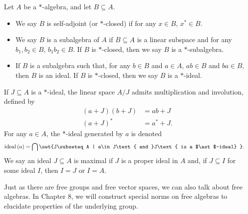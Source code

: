 \begin{definition}
  Let $A$ be a $\ast$-algebra, and let $B\subseteq A$.
  \begin{itemize}
    \item We say $B$ is self-adjoint (or $\ast$-closed) if for any $x\in B$, $x^{\ast}\in B$.
    \item We say $B$ is a subalgebra of $A$ if $B\subseteq A$ is a linear subspace and for any $b_1,b_2\in B$, $b_1b_2\in B$. If $B$ is $\ast$-closed, then we say $B$ is a $\ast$-subalgebra.
    \item If $B$ is a subalgebra such that, for any $b\in B$ and $a\in A$, $ab\in B$ and $ba\in B$, then $B$ is an ideal. If $B$ is $\ast$-closed, then we say $B$ is a $\ast$-ideal.
  \end{itemize}
  If $J\subseteq A$ is a $\ast$-ideal, the linear space $A/J$ admits multiplication and involution, defined by
  \begin{align*}
    \left(a+J\right)\left(b+J\right) &= ab + J\\
    \left(a+J\right)^{\ast} &= a^{\ast}+J.
  \end{align*}
  For any $a\in A$, the $\ast$-ideal generated by $a$ is denoted
  \begin{align*}
    \operatorname{ideal}\left(a\right) &= \bigcap\set{J\subseteq A | a\in J\text{ and }J\text{ is a $\ast$-ideal} }.
  \end{align*}
  We say an ideal $J\subseteq A$ is maximal if $J$ is a proper ideal in $A$ and, if $J\subseteq I$ for some ideal $I$, then $I = J$ or $I = A$.
\end{definition}
Just as there are free groups and free vector spaces, we can also talk about free algebras. In Chapter 8, we will construct special norms on free algebras to elucidate properties of the underlying group.\newline

